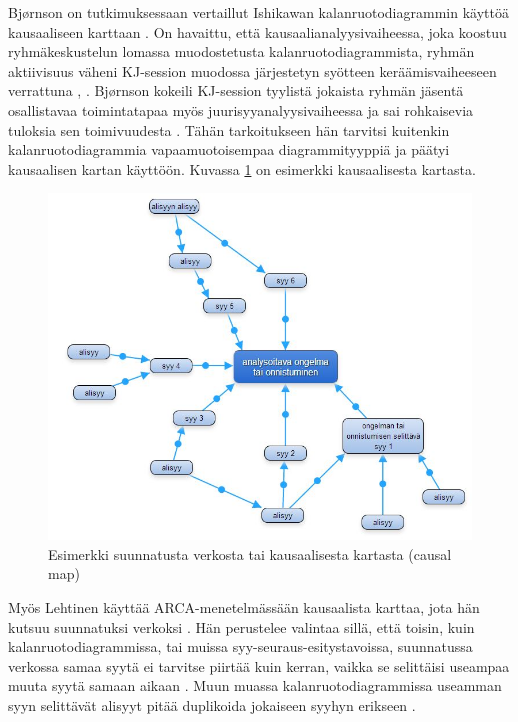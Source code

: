 Bj{\o}rnson on tutkimuksessaan vertaillut Ishikawan kalanruotodiagrammin käyttöä kausaaliseen karttaan \citep{Bjornson2009}. On havaittu, että kausaalianalyysivaiheessa, joka koostuu ryhmäkeskustelun lomassa muodostetusta kalanruotodiagrammista, ryhmän aktiivisuus väheni KJ-session muodossa järjestetyn syötteen keräämisvaiheeseen verrattuna \citep{Bjornson2009}, \citep{staalhane2003post}. Bj{\o}rnson kokeili KJ-session tyylistä jokaista ryhmän jäsentä osallistavaa toimintatapaa myös juurisyyanalyysivaiheessa  ja sai rohkaisevia tuloksia sen toimivuudesta \citep{Bjornson2009}. Tähän tarkoitukseen hän tarvitsi kuitenkin kalanruotodiagrammia vapaamuotoisempaa diagrammityyppiä ja päätyi kausaalisen kartan käyttöön. Kuvassa \ref{verkko_ex} on esimerkki kausaalisesta kartasta.

\begin{figure}[ht!]
\centering
\includegraphics[width=150mm]{suunnattu_verkko_esimerkki_relaatioilla.jpg}
\caption{Esimerkki suunnatusta verkosta tai kausaalisesta kartasta (causal map)}
\label{verkko_ex}
\end{figure}

Myös Lehtinen käyttää ARCA-menetelmässään kausaalista karttaa, jota hän kutsuu suunnatuksi verkoksi \citep{Lehtinen2011}. Hän perustelee valintaa sillä, että toisin, kuin kalanruotodiagrammissa, tai muissa syy-seuraus-esitystavoissa, suunnatussa verkossa samaa syytä ei tarvitse piirtää kuin kerran, vaikka se selittäisi useampaa muuta syytä samaan aikaan \citep{Lehtinen2011}. Muun muassa kalanruotodiagrammissa useamman syyn selittävät alisyyt pitää duplikoida jokaiseen syyhyn erikseen \citep{Lehtinen2011}. 

